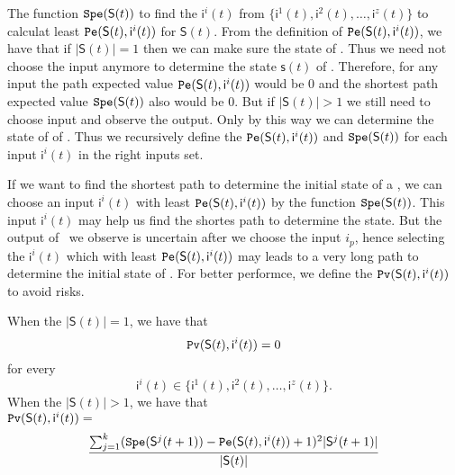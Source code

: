 The function ${\tt Spe}(\mathsf{S}(t))$ to find the $\mathsf{ i}^{i}(t)$ from $\{\mathsf{ i}^{1}(t),\mathsf{ i}^{2}(t),\ldots, \mathsf{ i}^{z}(t)\}$ to calculat least ${\tt Pe}(\mathsf{S}(t), \mathsf{ i}^{i}(t))$ for $\mathsf{S}(t)$. From the definition of ${\tt Pe}(\mathsf{S}(t), \mathsf{ i}^{i}(t))$, we have that if $|\mathsf{S}(t)|=1$ then we can make sure the state of \BCNs. Thus we need not choose the input anymore to determine the state $\mathsf{s}(t)$ of \BCNs. Therefore, for any input the path expected value ${\tt Pe}(\mathsf{S}(t), \mathsf{ i}^{i}(t))$ would be $0$ and the shortest path expected value ${\tt Spe}(\mathsf{S}(t))$ also would be $0$. But if $|\mathsf{S}(t)|>1$ we still need to choose input and observe the output. Only by this way we can determine the state of of \BCNs. Thus we recursively define the ${\tt Pe}(\mathsf{S}(t), \mathsf{ i}^{i}(t))$ and ${\tt Spe}(\mathsf{S}(t))$ for each input $\mathsf{ i}^{i}(t)$ in the right inputs set. 

If we want to find the shortest path to determine the initial state of a \BCN, we can choose an input $\mathsf{ i}^{i}(t)$ with least ${\tt Pe}(\mathsf{S}(t), \mathsf{ i}^{i}(t))$ by the function ${\tt Spe}(\mathsf{S}(t))$. This input $\mathsf{ i}^{i}(t)$ may help us find the shortes path to determine the state. But the output of \BCNs\ we observe is uncertain after we choose the input $i_p$, hence selecting the $\mathsf{ i}^{i}(t)$ which with least ${\tt Pe}(\mathsf{S}(t), \mathsf{ i}^{i}(t))$ may leads to a very long path to determine the initial state of \BCNs. For better performce, we define the ${\tt Pv}(\mathsf{S}(t), \mathsf{ i}^{i}(t))$ to avoid risks.%
\begin{definition} 
When the $|\mathsf{S}(t)|=1$, we have that
\[{\tt Pv}(\mathsf{S}(t), \mathsf{ i}^{i}(t))=0\]  for every \[\mathsf{ i}^{i}(t) \in \{\mathsf{ i}^{1}(t),\mathsf{ i}^{2}(t),\ldots, \mathsf{ i}^{z}(t)\}.\]  When the $|\mathsf{S}(t)|>1$, 
we have that\\ ${\tt Pv}(\mathsf{S}(t), \mathsf{ i}^{i}(t))=$
\[\frac{\sum_{j=1}^k ({\tt Spe}(\mathsf{S}^{j}(t+1))-{\tt Pe}(\mathsf{S}(t), \mathsf{ i}^{i}(t))+1)^2 |\mathsf{S}^{j}(t+1)|}{ |\mathsf{S}(t)|}\]
\end{definition}

